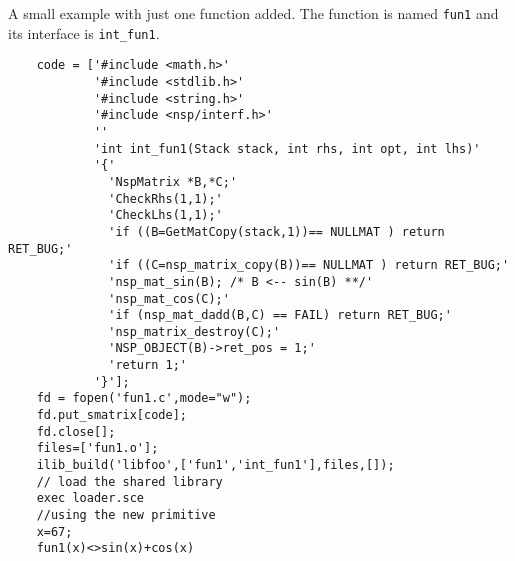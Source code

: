 \begin{examples}
  A small example with just one function added. The function 
  is named \verb!fun1! and its interface is \verb!int_fun1!.
  \begin{Verbatim}
    code = ['#include <math.h>'
            '#include <stdlib.h>'
            '#include <string.h>'
            '#include <nsp/interf.h>'
            ''
            'int int_fun1(Stack stack, int rhs, int opt, int lhs)'
            '{'
              'NspMatrix *B,*C;'
              'CheckRhs(1,1);'
              'CheckLhs(1,1);'
              'if ((B=GetMatCopy(stack,1))== NULLMAT ) return RET_BUG;'
              'if ((C=nsp_matrix_copy(B))== NULLMAT ) return RET_BUG;'
              'nsp_mat_sin(B); /* B <-- sin(B) **/'
              'nsp_mat_cos(C);'
              'if (nsp_mat_dadd(B,C) == FAIL) return RET_BUG;'
              'nsp_matrix_destroy(C);'
              'NSP_OBJECT(B)->ret_pos = 1;'
              'return 1;'
            '}'];
    fd = fopen('fun1.c',mode="w");
    fd.put_smatrix[code];
    fd.close[];
    files=['fun1.o'];
    ilib_build('libfoo',['fun1','int_fun1'],files,[]);
    // load the shared library 
    exec loader.sce 
    //using the new primitive 
    x=67;
    fun1(x)<>sin(x)+cos(x)
  \end{Verbatim}
\end{examples}
\begin{manseealso}
\end{manseealso}

